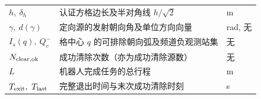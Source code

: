 \begin{table}[!htbp]
\begin{tabular}{lll}
        $h,\ \delta_h$       & 认证方格边长及半对角线 $h/\sqrt2$ & m \\
        $\gamma,\ d(\gamma)$ & 定向源的发射朝向角及单位方向向量 & rad, 无 \\
        $I_s(q),\ Q_c^-$     & 格中心 $q$ 的可排除朝向弧及频道负观测站集 & 无 \\
        $N_{\rm clear,ok}$   & 成功清除次数（亦为成功清除源数） & 无 \\
        $L$                 & 机器人完成任务的总行程 & m \\
        $T_{\rm exit},\ T_{\rm last}$ & 完整退出时间与末次成功清除时刻 & s \\
        \bottomrule
    \end{tabular}
\end{table}
